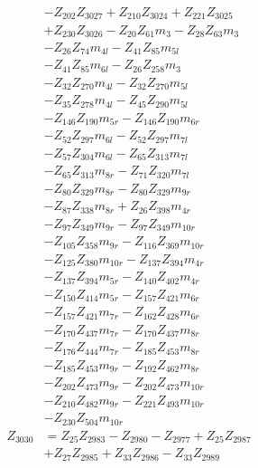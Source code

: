 \begin{multicols}{2}
\begin{align}
&- Z_{202}Z_{3027} + Z_{210}Z_{3024} + Z_{221}Z_{3025}  \nonumber \\
&+ Z_{230}Z_{3026} - Z_{20}Z_{61}m_3 - Z_{28}Z_{63}m_3  \nonumber \\
&- Z_{26}Z_{74}m_{4l} - Z_{41}Z_{85}m_{5l}  \nonumber \\
&- Z_{41}Z_{85}m_{6l} - Z_{26}Z_{258}m_3  \nonumber \\
&- Z_{32}Z_{270}m_{4l} - Z_{32}Z_{270}m_{5l}  \nonumber \\
&- Z_{35}Z_{278}m_{4l} - Z_{45}Z_{290}m_{5l}  \nonumber \\
&- Z_{146}Z_{190}m_{5r} - Z_{146}Z_{190}m_{6r}  \nonumber \\
&- Z_{52}Z_{297}m_{6l} - Z_{52}Z_{297}m_{7l}  \nonumber \\
&- Z_{57}Z_{304}m_{6l} - Z_{65}Z_{313}m_{7l}  \nonumber \\
&- Z_{65}Z_{313}m_{8r} - Z_{71}Z_{320}m_{7l}  \nonumber \\
&- Z_{80}Z_{329}m_{8r} - Z_{80}Z_{329}m_{9r}  \nonumber \\
&- Z_{87}Z_{338}m_{8r} + Z_{26}Z_{398}m_{4r}  \nonumber \\
&- Z_{97}Z_{349}m_{9r} - Z_{97}Z_{349}m_{10r}  \nonumber \\
&- Z_{105}Z_{358}m_{9r} - Z_{116}Z_{369}m_{10r}  \nonumber \\
&- Z_{125}Z_{380}m_{10r} - Z_{137}Z_{394}m_{4r}  \nonumber \\
&- Z_{137}Z_{394}m_{5r} - Z_{140}Z_{402}m_{4r}  \nonumber \\
&- Z_{150}Z_{414}m_{5r} - Z_{157}Z_{421}m_{6r}  \nonumber \\
&- Z_{157}Z_{421}m_{7r} - Z_{162}Z_{428}m_{6r}  \nonumber \\
&- Z_{170}Z_{437}m_{7r} - Z_{170}Z_{437}m_{8r}  \nonumber \\
&- Z_{176}Z_{444}m_{7r} - Z_{185}Z_{453}m_{8r}  \nonumber \\
&- Z_{185}Z_{453}m_{9r} - Z_{192}Z_{462}m_{8r}  \nonumber \\
&- Z_{202}Z_{473}m_{9r} - Z_{202}Z_{473}m_{10r}  \nonumber \\
&- Z_{210}Z_{482}m_{9r} - Z_{221}Z_{493}m_{10r}  \nonumber \\
&- Z_{230}Z_{504}m_{10r} \nonumber \\
Z_{3030} &= Z_{25}Z_{2983} - Z_{2980} - Z_{2977} + Z_{25}Z_{2987}  \nonumber \\
&+ Z_{27}Z_{2985} + Z_{33}Z_{2986} - Z_{33}Z_{2989}  \nonumber \\

\end{align}
\end{multicols}
